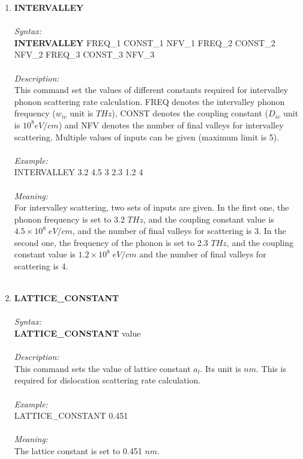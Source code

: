 \documentclass[12pt]{article}
\begin{document}
\begin{enumerate}
    \item \textbf{INTERVALLEY}   \\ \\
    \textit{Syntax:} \\
    \textbf{INTERVALLEY} FREQ\_1 CONST\_1 NFV\_1 FREQ\_2 CONST\_2 NFV\_2 FREQ\_3 CONST\_3 NFV\_3 \\ \\
    \textit{Description:} \\
    This command set the values of different constants required for intervalley phonon scattering rate calculation. FREQ denotes the intervalley phonon frequency ($w_{iv}$ unit is $THz$), CONST denotes the coupling constant ($D_{iv} $ unit is $10^8 eV/cm$) and NFV denotes the number of final valleys for intervalley scattering. Multiple values of inputs can be given (maximum limit is 5). \\ \\
    \textit{Example:} \\
    INTERVALLEY 3.2 4.5 3 2.3 1.2 4 \\ \\
    \textit{Meaning:} \\  
    For intervalley scattering, two sets of inputs are given. In the first one, the phonon frequency is set to 3.2 $THz$, and the coupling constant value is $4.5 \times 10^{8} \; eV/cm$, and the number of final valleys for scattering is 3. In the second one, the frequency of the phonon is set to 2.3 $THz$, and the coupling constant value is $1.2 \times 10^{8} \; eV/cm$ and the number of final valleys for scattering is 4. \\ \\    



    \item \textbf{LATTICE\_CONSTANT}   \\ \\
    \textit{Syntax:} \\
    \textbf{LATTICE\_CONSTANT} value \\ \\
    \textit{Description:} \\
    This command sets the value of lattice constant $a_l$. Its unit is $nm$. This is required for dislocation scattering rate calculation. \\ \\
    \textit{Example:} \\
    LATTICE\_CONSTANT 0.451 \\ \\
    \textit{Meaning:} \\    
    The lattice constant is set to 0.451 $nm$. \\ \\


\end{enumerate}
\end{document}
